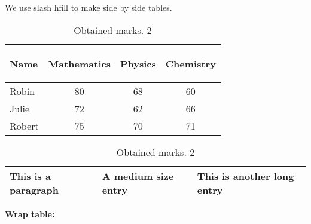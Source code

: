 \documentclass[a4paper]{article}
\begin{document}
We use slash hfill to make side by side tables.
\begin{table}[!hbt]  %
    \caption{Obtained marks. 2}
    \begin{tabular}{|l|c|c|c|}
        \hline Name   & \begin{sideways}Mathematics\end{sideways} & \begin{sideways}Physics\end{sideways} & \begin{sideways}Chemistry\end{sideways} \\
        \hline Robin  & 80                                        & 68                                    & 60                                      \\
        \hline Julie  & 72                                        & 62                                    & 66                                      \\
        \hline Robert & 75                                        & 70                                    & 71                                      \\
        \hline
    \end{tabular} \hfill
    \begin{tabular}{|p{3.5cm}|m{1.5cm}|b{1.6cm}|} %
        \hline This is a paragraph & A medium size entry & This is another long entry \\
        \hline
    \end{tabular}
\end{table}














{\bf Wrap table:} \\
\end{document}
